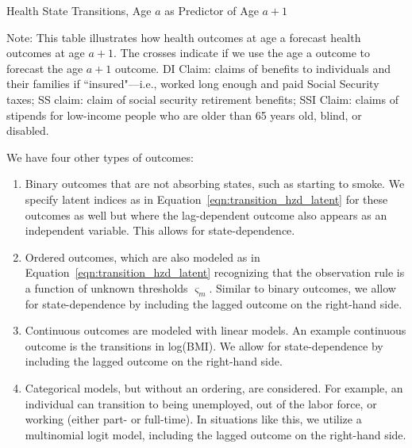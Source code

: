 \begin{table}
\begin{threeparttable}
\caption{Health State Transitions, Age $a$ as Predictor of Age $a+1$}\label{table:transition}
\scriptsize

{\flushleft\footnotesize
Note: This table illustrates how health outcomes at age a forecast health outcomes at age $a + 1$. The crosses indicate if we use the age a outcome to forecast the age $a + 1$ outcome. DI Claim: claims of benefits to individuals and their families if ``insured"---i.e., worked long enough and paid Social Security taxes; SS claim: claim of social security retirement benefits; SSI Claim: claims of stipends for low-income people who are older than 65 years old, blind, or disabled.}
\end{threeparttable}
\end{table}

%


\noindent We have four other types of outcomes: \\
\begin{enumerate}
\item Binary outcomes that are not absorbing states, such as starting to smoke. We specify latent
indices as in Equation~\eqref{eqn:transition_hzd_latent} for these outcomes as well but where
the lag-dependent outcome also appears as an independent variable. This allows for state-dependence.

\item Ordered outcomes, which are also modeled as in Equation~\eqref{eqn:transition_hzd_latent} recognizing that the observation rule is
a function of unknown thresholds $\varsigma_m$. Similar to binary outcomes, we allow for state-dependence by including the lagged outcome
on the right-hand side.

\item Continuous outcomes are modeled with linear models. An example continuous outcome is the
transitions in log(BMI). We allow for state-dependence by including the lagged outcome on the right-hand side.

\item Categorical models, but without an ordering, are considered. For example, an individual can transition
to being unemployed, out of the labor force, or working (either part- or full-time). In situations like this, we utilize
a multinomial logit model, including the lagged outcome on the right-hand side.

\end{enumerate}

